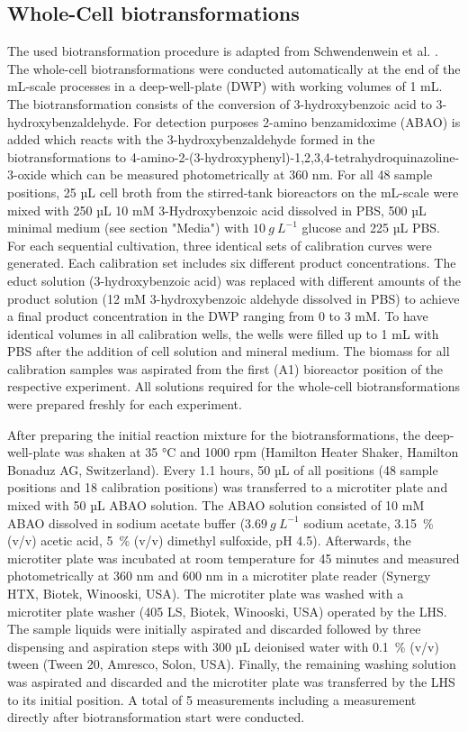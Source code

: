 \documentclass[sn-standardnature]{sn-jnl}%
\theoremstyle{thmstyleone}%
\theoremstyle{thmstyletwo}%
\theoremstyle{thmstylethree}%
\begin{document}
\subsection{Whole-Cell biotransformations}
The used biotransformation procedure is adapted from Schwendenwein et al. \cite{schwendenwein2019random}.
The whole-cell biotransformations were conducted automatically at the end of the mL-scale processes in a deep-well-plate (DWP) with working volumes of 1 mL.
The biotransformation consists of the conversion of 3-hydroxybenzoic acid to 3-hydroxybenzaldehyde.
For detection purposes 2-amino benzamidoxime (ABAO) is added which reacts with the 3-hydroxybenzaldehyde formed in the biotransformations to 4-amino-2-(3-hydroxyphenyl)-1,2,3,4-tetrahydroquinazoline-3-oxide which can be measured photometrically at 360 nm.
For all 48 sample positions, 25 µL cell broth from the stirred-tank bioreactors on the mL-scale were mixed with 250 µL 10 mM 3-Hydroxybenzoic acid dissolved in PBS, 500 µL minimal  medium (see section "Media") with $10\ g\ L^{-1}$ glucose and 225 µL PBS.
For each sequential cultivation, three identical sets of calibration curves were generated.
Each calibration set includes six different product concentrations.
The educt solution (3-hydroxybenzoic acid) was replaced with different amounts of the product solution (12 mM 3-hydroxybenzoic aldehyde dissolved in PBS) to achieve a final product concentration in the DWP ranging from 0 to 3 mM.
To have identical volumes in all calibration wells, the wells were filled up to 1 mL with PBS after the addition of cell solution and mineral medium.
The biomass for all calibration samples was aspirated from the first (A1) bioreactor position of the respective experiment.
All solutions required for the whole-cell biotransformations were prepared freshly for each experiment.

After preparing the initial reaction mixture for the biotransformations, the deep-well-plate was shaken at 35 °C and 1000 rpm (Hamilton Heater Shaker, Hamilton Bonaduz AG, Switzerland).
Every 1.1 hours, 50 µL of all positions (48 sample positions and 18 calibration positions) was transferred to a microtiter plate and mixed with 50 µL ABAO solution.
The ABAO solution consisted of 10 mM ABAO dissolved in sodium acetate buffer ($3.69\ g\ L^{-1}$ sodium acetate, 3.15~\% (v/v) acetic acid, 5~\% (v/v) dimethyl sulfoxide, pH 4.5).
Afterwards, the microtiter plate was incubated at room temperature for 45 minutes and measured photometrically at 360 nm and 600 nm in a microtiter plate reader (Synergy HTX, Biotek, Winooski, USA).
The microtiter plate was washed with a microtiter plate washer (405 LS, Biotek, Winooski, USA) operated by the LHS.
The sample liquids were initially aspirated and discarded followed by three dispensing and aspiration steps with 300 µL deionised water with 0.1~\% (v/v) tween (Tween 20, Amresco, Solon, USA).
Finally, the remaining washing solution was aspirated and discarded and the microtiter plate was transferred by the LHS to its initial position.
A total of 5 measurements including a measurement directly after biotransformation start were conducted.
\end{document}
